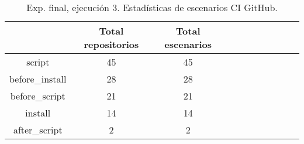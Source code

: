 \begin{table}[h]
  \centering
  \caption{Exp. final, ejecución 3. Estadísticas de escenarios CI GitHub.}
  \label{tab:tabla_f3_5}

\begin{footnotesize}
\renewcommand{\arraystretch}{1.5} %
\begin{tabular}{ccccccccccc}
  \hline
  {} &  Total repositorios &  Total escenarios \\
  \hline
  script         &                  45 &            45 \\
  before\_install &                  28 &            28 \\
  before\_script  &                  21 &            21 \\
  install        &                  14 &            14 \\
  after\_script   &                   2 &             2 \\
 \end{tabular}
\end{footnotesize}

\end{table}